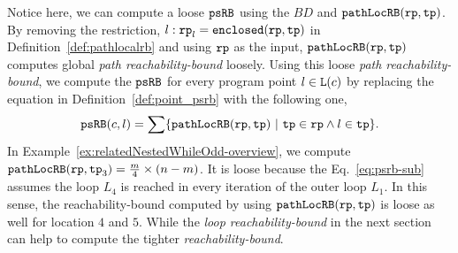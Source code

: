 
Notice here, we can compute a loose $\mathtt{psRB}$ using the $BD$ and $\mathtt{pathLocRB}(\mathtt{rp}, \mathtt{tp})$. By removing the restriction, $l: \mathtt{rp}_l = \mathtt{enclosed}(\mathtt{rp}, \mathtt{tp})$ in Definition~\ref{def:pathlocalrb} and using $\mathtt{rp}$
as the input, $\mathtt{pathLocRB}(\mathtt{rp}, \mathtt{tp})$ computes global \emph{path reachability-bound} loosely.
Using this loose \emph{path reachability-bound},
we compute the $\mathtt{psRB}$ for every program point $l \in \mathtt{L}(c)$ by replacing the equation in Definition~\ref{def:point_psrb} with the following one,
\begin{equation}
  \label{eq:psrb-sub}
  \psRB(c, l) = 
  \sum
  \left\{ \outinB(\rprog, \tpath) ~\vert~ \tpath \in \rprog \land 
  l \in \tpath \right\}.
\end{equation}
In Example~\ref{ex:relatedNestedWhileOdd-overview},
we compute
$\mathtt{pathLocRB}(\mathtt{rp}, \mathtt{tp}_3) = \frac{m}{4} \times (n - m)$.
It is loose because the Eq.~\ref{eq:psrb-sub} assumes the loop $L_4$ is reached in every iteration of the outer loop $L_1$. In this sense, the reachability-bound computed by using $\mathtt{pathLocRB}(\mathtt{rp}, \mathtt{tp})$ is loose as well for location $4$ and $5$.
While the \emph{loop reachability-bound} in the next section can help to compute the tighter \emph{reachability-bound}.
